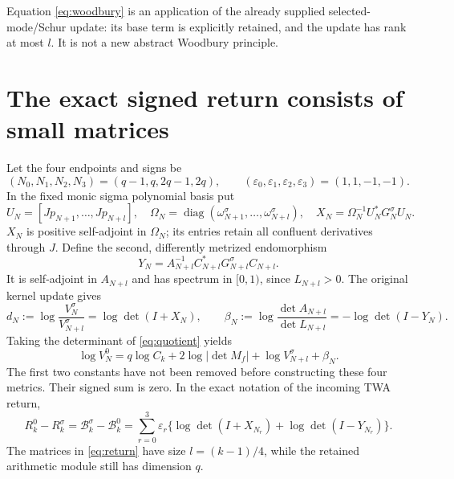 \documentclass[11pt,a4paper]{article}
\newcommand{\diag}{\operatorname{diag}}
\newcommand{\eps}{\varepsilon}
\begin{document}
Equation \eqref{eq:woodbury} is an application of the already supplied selected-mode/Schur update: its base term is explicitly retained, and the update has rank at most $l$. It is not a new abstract Woodbury principle.

\section{The exact signed return consists of small matrices}\label{sec:signed}
Let the four endpoints and signs be
\begin{equation}
 (N_0,N_1,N_2,N_3)=(q-1,q,2q-1,2q),\qquad
 (\eps_0,\eps_1,\eps_2,\eps_3)=(1,1,-1,-1).
\end{equation}
In the fixed monic sigma polynomial basis put
\begin{equation}
 U_N=[Jp_{N+1},\ldots,Jp_{N+l}],\quad
 \Omega_N=\diag(\omega_{N+1}^\sigma,\ldots,\omega_{N+l}^\sigma),\quad
 X_N=\Omega_N^{-1}U_N^*G_N^\sigma U_N.
\end{equation}
$X_N$ is positive self-adjoint in $\Omega_N$; its entries retain all confluent derivatives through $J$. Define the second, differently metrized endomorphism
\begin{equation}
 Y_N=A_{N+l}^{-1}C_{N+l}^*G_{N+l}^\sigma C_{N+l}.
\end{equation}
It is self-adjoint in $A_{N+l}$ and has spectrum in $[0,1)$, since $L_{N+l}>0$.
The original kernel update gives
\begin{equation}
 d_N:=\log\frac{V_N^\sigma}{V_{N+l}^\sigma}=\log\det(I+X_N),\qquad
 \beta_N:=\log\frac{\det A_{N+l}}{\det L_{N+l}}=-\log\det(I-Y_N).
\end{equation}
Taking the determinant of \eqref{eq:quotient} yields
\begin{equation}
 \log V_N^0=q\log C_k+2\log|\det M_f|+\log V_{N+l}^\sigma+\beta_N.
\end{equation}
The first two constants have not been removed before constructing these four metrics. Their signed sum is zero. In the exact notation of the incoming TWA return,
\begin{equation}
 \boxed{R_k^0-R_k^\sigma
 =\mathcal B_k^\sigma-\mathcal B_k^0
 =\sum_{r=0}^3\eps_r\{\log\det(I+X_{N_r})+\log\det(I-Y_{N_r})\}.}
 \label{eq:return}
\end{equation}
The matrices in \eqref{eq:return} have size $l=(k-1)/4$, while the retained arithmetic module still has dimension $q$.
\end{document}
